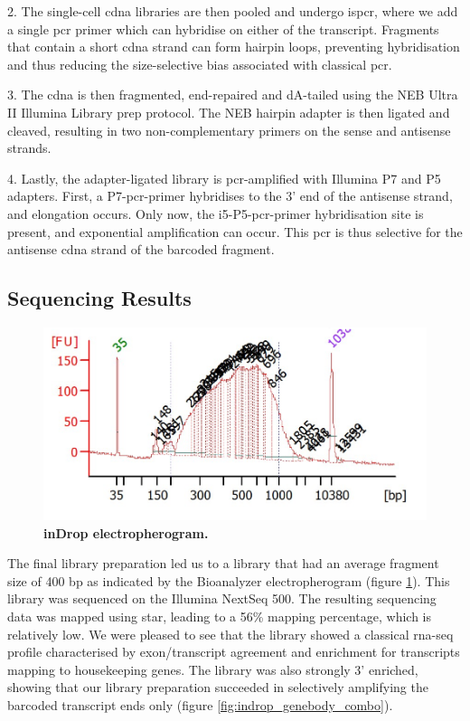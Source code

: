 2. The single-cell \acrshort{cdna} libraries are then pooled and undergo \acrshort{ispcr}, where we add a single \acrshort{pcr} primer which can hybridise on either of the transcript. Fragments that contain a short \acrshort{cdna} strand can form hairpin loops, preventing hybridisation and thus reducing the size-selective bias associated with classical \acrshort{pcr}.\medskip

3. The \acrshort{cdna} is then fragmented, end-repaired and dA-tailed using the NEB Ultra II Illumina Library prep protocol. The NEB hairpin adapter is then ligated and cleaved, resulting in two non-complementary primers on the sense and antisense strands.\medskip

4. Lastly, the adapter-ligated library is \acrshort{pcr}-amplified with Illumina P7 and P5 adapters. First, a P7-\acrshort{pcr}-primer hybridises to the 3' end of the antisense strand, and elongation occurs. Only now, the i5-P5-\acrshort{pcr}-primer hybridisation site is present, and exponential amplification can occur. This \acrshort{pcr} is thus selective for the antisense \acrshort{cdna} strand of the barcoded fragment.\medskip
\clearpage

\subsection{Sequencing Results}
\begin{figure}
\centering
\includegraphics[width=\textwidth/2]{./ims/indrop_C3_bioanalyzer.png}
\caption[inDrop electropherogram]{\textbf{inDrop electropherogram.}}
\label{fig:indrop_bioanalyzer}
\vspace{-20pt}
\end{figure}

The final library preparation led us to a library that had an average fragment size of 400 bp as indicated by the Bioanalyzer electropherogram (figure \ref{fig:indrop_bioanalyzer}). This library was sequenced on the Illumina NextSeq 500. The resulting sequencing data was mapped using \acrshort{star}, leading to a 56\% mapping percentage, which is relatively low. We were pleased to see that the library showed a classical \acrshort{rna-seq} profile characterised by exon/transcript agreement and enrichment for transcripts mapping to housekeeping genes. The library was also strongly 3' enriched, showing that our library preparation succeeded in selectively amplifying the barcoded transcript ends only (figure \ref{fig:indrop_genebody_combo}).\pms

